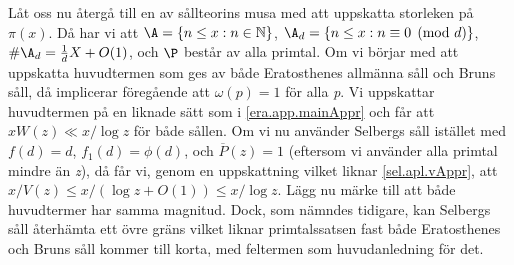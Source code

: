 Låt oss nu återgå till en av sållteorins musa med att uppskatta storleken på \(\pi(x)\).
Då har vi att \(\A = \{n \leq x: n \in \mathbb{N}\}\), \(\A_d = \{n \leq x: n\equiv 0 \pmod d\}\), \(\#\A_d = \frac{1}{d}X + O(1)\), och \(\P\) består av alla primtal. 
Om vi börjar med att uppskatta huvudtermen som ges av både Eratosthenes allmänna såll och Bruns såll, då implicerar föregående att \(\omega(p) = 1\) för alla \textit{p}.
Vi uppskattar huvudtermen på en liknade sätt som i \eqref{era.app.mainAppr} och får att \(xW(z) \ll x/\log z\) för både sållen.
Om vi nu använder Selbergs såll istället med \(f(d) = d\), \(f_1(d) = \phi(d)\), och \(\overline{P}(z) = 1\) (eftersom vi använder alla primtal mindre än \textit{z}), då får vi, genom en uppskattning vilket liknar \eqref{sel.apl.vAppr}, att \(x/V(z) \leq x/(\log z + O(1)) \leq x/\log z\).
Lägg nu märke till att både huvudtermer har samma magnitud.
Dock, som nämndes tidigare, kan Selbergs såll återhämta ett övre gräns vilket liknar primtalssatsen fast både Eratosthenes och Bruns såll kommer till korta, med feltermen som huvudanledning för det.


